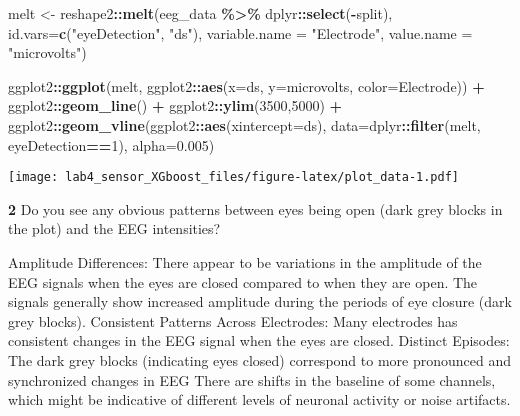 \documentclass[
]{article}
\newenvironment{Shaded}{\begin{snugshade}}{\end{snugshade}}
\newcommand{\AttributeTok}[1]{\textcolor[rgb]{0.13,0.29,0.53}{#1}}
\newcommand{\DecValTok}[1]{\textcolor[rgb]{0.00,0.00,0.81}{#1}}
\newcommand{\FloatTok}[1]{\textcolor[rgb]{0.00,0.00,0.81}{#1}}
\newcommand{\FunctionTok}[1]{\textcolor[rgb]{0.13,0.29,0.53}{\textbf{#1}}}
\newcommand{\NormalTok}[1]{#1}
\newcommand{\OtherTok}[1]{\textcolor[rgb]{0.56,0.35,0.01}{#1}}
\newcommand{\SpecialCharTok}[1]{\textcolor[rgb]{0.81,0.36,0.00}{\textbf{#1}}}
\newcommand{\StringTok}[1]{\textcolor[rgb]{0.31,0.60,0.02}{#1}}
\begin{document}
\begin{Shaded}
\begin{Highlighting}[]
\NormalTok{melt }\OtherTok{\textless{}{-}}\NormalTok{ reshape2}\SpecialCharTok{::}\FunctionTok{melt}\NormalTok{(eeg\_data }\SpecialCharTok{\%\textgreater{}\%}\NormalTok{ dplyr}\SpecialCharTok{::}\FunctionTok{select}\NormalTok{(}\SpecialCharTok{{-}}\NormalTok{split), }\AttributeTok{id.vars=}\FunctionTok{c}\NormalTok{(}\StringTok{"eyeDetection"}\NormalTok{, }\StringTok{"ds"}\NormalTok{), }\AttributeTok{variable.name =} \StringTok{"Electrode"}\NormalTok{, }\AttributeTok{value.name =} \StringTok{"microvolts"}\NormalTok{)}


\NormalTok{ggplot2}\SpecialCharTok{::}\FunctionTok{ggplot}\NormalTok{(melt, ggplot2}\SpecialCharTok{::}\FunctionTok{aes}\NormalTok{(}\AttributeTok{x=}\NormalTok{ds, }\AttributeTok{y=}\NormalTok{microvolts, }\AttributeTok{color=}\NormalTok{Electrode)) }\SpecialCharTok{+} 
\NormalTok{  ggplot2}\SpecialCharTok{::}\FunctionTok{geom\_line}\NormalTok{() }\SpecialCharTok{+} 
\NormalTok{  ggplot2}\SpecialCharTok{::}\FunctionTok{ylim}\NormalTok{(}\DecValTok{3500}\NormalTok{,}\DecValTok{5000}\NormalTok{) }\SpecialCharTok{+} 
\NormalTok{  ggplot2}\SpecialCharTok{::}\FunctionTok{geom\_vline}\NormalTok{(ggplot2}\SpecialCharTok{::}\FunctionTok{aes}\NormalTok{(}\AttributeTok{xintercept=}\NormalTok{ds), }\AttributeTok{data=}\NormalTok{dplyr}\SpecialCharTok{::}\FunctionTok{filter}\NormalTok{(melt, eyeDetection}\SpecialCharTok{==}\DecValTok{1}\NormalTok{), }\AttributeTok{alpha=}\FloatTok{0.005}\NormalTok{)}
\end{Highlighting}
\end{Shaded}

\texttt{[image: lab4\_sensor\_XGboost\_files/figure-latex/plot\_data-1.pdf]}

\textbf{2} Do you see any obvious patterns between eyes being open (dark
grey blocks in the plot) and the EEG intensities?

Amplitude Differences: There appear to be variations in the amplitude of
the EEG signals when the eyes are closed compared to when they are open.
The signals generally show increased amplitude during the periods of eye
closure (dark grey blocks). Consistent Patterns Across Electrodes: Many
electrodes has consistent changes in the EEG signal when the eyes are
closed. Distinct Episodes: The dark grey blocks (indicating eyes closed)
correspond to more pronounced and synchronized changes in EEG There are
shifts in the baseline of some channels, which might be indicative of
different levels of neuronal activity or noise artifacts.
\end{document}
